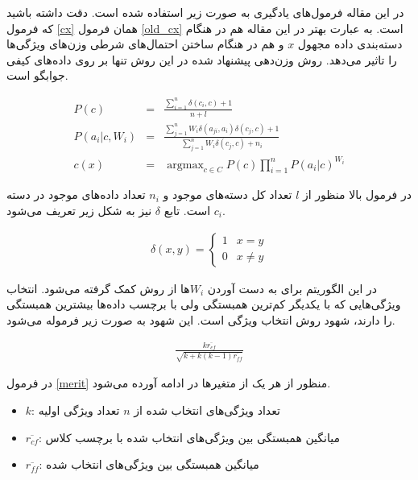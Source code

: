 \documentclass[12pt, a4paper]{article}
\DeclareMathOperator*{\argmax}{argmax}
\begin{document}
در این مقاله فرمول‌های یادگیری  به صورت زیر استفاده شده است.
دقت داشته باشید که فرمول \ref{cx} همان فرمول \ref{old_cx} است. به عبارت بهتر در این مقاله هم در هنگام
دسته‌بندی داده مجهول $x$ و هم در هنگام ساختن احتمال‌های شرطی وزن‌های ویژگی‌ها را تاثیر می‌دهد.
روش وزن‌دهی پیشنهاد شده در این روش تنها بر روی داده‌های کیفی جوابگو است.

\begin{eqnarray}
    P(c) & = & \frac{\sum_{i=1}^{n} \delta(c_i, c) + 1}{n + l} \label{Pc}\\
    P(a_i|c, W_i) & = & \frac{\sum_{j=1}^{n} W_i\delta(a_{ji}, a_i)\delta(c_j, c)+1}{\sum_{j=1}^{n} W_i\delta(c_j, c) + n_i} \label{Pac} \\
    c(x) & = & \argmax_{c \in C} P(c) \prod_{i=1}^{n} P(a_i|c)^{W_i} \label{cx}
\end{eqnarray}

در فرمول بالا منظور از $l$ تعداد کل دسته‌های موجود و $n_i$ تعداد داده‌های موجود در دسته $c_i$ است. تابع
$\delta$ نیز به شکل زیر تعریف می‌شود.

\begin{eqnarray}
    \delta(x,y)=\begin{cases}
        1 & x=y \\
        0 & x\neq y
    \end{cases}
\end{eqnarray}


در این الگوریتم برای به دست آوردن $W_i$ها از روش  کمک گرفته می‌شود.
انتخاب ویژگی‌هایی که با یکدیگر کم‌ترین همبستگی ولی با برچسب داده‌ها بیشترین همبستگی را دارند،
شهود روش انتخاب ویژگی  است. این شهود به صورت زیر فرموله می‌شود.

\begin{eqnarray}
    \frac{k\overline{r_{cf}}}{\sqrt{k + k(k-1)\overline{r_{ff}}}} \label{merit}
\end{eqnarray}

در فرمول \ref{merit} منظور از هر یک از متغیر‌ها در ادامه آورده می‌شود.

\begin{itemize}
    \item $k$: تعداد ویژگی‌های انتخاب شده از $n$ تعداد ویژگی اولیه
    \item $\overline{r_{cf}}$: میانگین همبستگی بین ویژگی‌های انتخاب شده با برچسب کلاس
    \item $\overline{r_{ff}}$: میانگین همبستگی بین ویژگی‌های انتخاب شده
\end{itemize}
\end{document}

